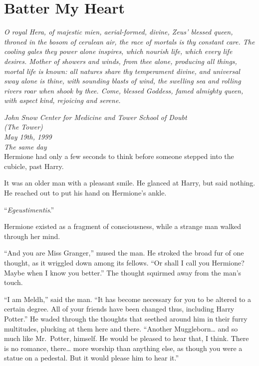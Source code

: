 \hypertarget{batter-my-heart}{%
\chapter{Batter My Heart}\label{batter-my-heart}}

\emph{O royal Hera, of majestic mien, aerial-formed, divine, Zeus'
blessed queen, throned in the bosom of cerulean air, the race of mortals
is thy constant care. The cooling gales they power alone inspires, which
nourish life, which every life desires. Mother of showers and winds,
from thee alone, producing all things, mortal life is known: all natures
share thy temperament divine, and universal sway alone is thine, with
sounding blasts of wind, the swelling sea and rolling rivers roar when
shook by thee. Come, blessed Goddess, famed almighty queen, with aspect
kind, rejoicing and serene.}


\mybreak

\emph{John Snow Center for Medicine and Tower School of Doubt\\
(The Tower)}\\
\emph{May 19th, 1999}\\
\emph{The same day}\\

Hermione had only a few seconds to think before someone stepped into the
cubicle, past Harry.

It was an older man with a pleasant smile. He glanced at Harry, but said
nothing. He reached out to put his hand on Hermione's ankle.

``\emph{Egeustimentis}.''

\mybreak

Hermione existed as a fragment of consciousness, while a strange man
walked through her mind.

``And you are Miss Granger,'' mused the man. He stroked the broad fur of
one thought, as it wriggled down among its fellows. ``Or shall I call
you Hermione? Maybe when I know you better.'' The thought squirmed away
from the man's touch.

``I am Meldh,'' said the man. ``It has become necessary for you to be
altered to a certain degree. All of your friends have been changed thus,
including Harry Potter.'' He waded through the thoughts that seethed
around him in their furry multitudes, plucking at them here and there.
``Another Muggleborn\ldots{} and so much like Mr.~Potter, himself. He
would be pleased to hear that, I think. There is no romance,
there\ldots{} more worship than anything else, as though you were a
statue on a pedestal. But it would please him to hear it.''

